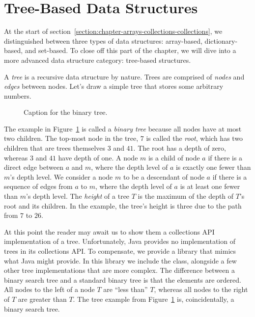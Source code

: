\section{Tree-Based Data Structures}
At the start of section~\ref{section:chapter-arrays-collections-collections}, we distinguished between three types of data structures: array-based, dictionary-based, and set-based. To close off this part of the chapter, we will dive into a more advanced data structure category: tree-based structures.

A \emph{tree} is a recursive data structure by nature. Trees are comprised of \emph{nodes} and \emph{edges} between nodes. Let's draw a simple tree that stores some arbitrary numbers.

\begin{figure}[ht]
\centering
{}
\caption{Caption for the binary tree.}
\label{fig:binarytree}
\end{figure}

The example in Figure~\ref{fig:binarytree} is called a \emph{binary tree} because all nodes have at most two children. 
The top-most node in the tree, $7$ is called the \emph{root}, which has two children that are trees themselves $3$ and $41$. 
The root has a depth of zero, whereas $3$ and $41$ have depth of one. 
A node $m$ is a child of node $a$ if there is a direct edge between $a$ and $m$, where the depth level of $a$ is exactly one fewer than $m$'s depth level. 
We consider a node $m$ to be a descendant of node $a$ if there is a sequence of edges from $a$ to $m$, where the depth level of $a$ is at least one fewer than $m$'s depth level. 
The \emph{height} of a tree $T$ is the maximum of the depth of $T$'s root and its children. 
In the example, the tree's height is three due to the path from $7$ to $26$.

At this point the reader may await us to show them a collections API implementation of a tree. 
Unfortunately, Java provides no implementation of trees in its collections API. 
To compensate, we provide a library that mimics what Java might provide. In this library we include the  class, alongside a few other tree implementations that are more complex. 
The difference between a binary search tree and a standard binary tree is that the elements are ordered. 
All nodes to the left of a node $T$ are ``less than'' $T$, whereas all nodes to the right of $T$ are greater than $T$.
The tree example from Figure~\ref{fig:binarytree} is, coincidentally, a binary search tree.

